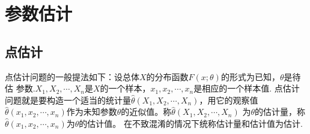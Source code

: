 \section{参数估计}
\subsection{点估计}

\begin{definition}
    点估计问题的一般提法如下：设总体$X$的分布函数$F(x;\theta)$的形式为已知，$\theta$是待估
    参数.$X_1,X_2,\cdots,X_n$是$X$的一个样本，$x_1,x_2,\cdots,x_n$是相应的一个样本值.
    点估计问题就是要构造一个适当的统计量$\hat{\theta}(X_1,X_2,\cdots,X_n)$，用它的观察值
    $\hat{\theta}(x_1,x_2,\cdots,x_n)$作为未知参数$\theta$的近似值。称$\hat{\theta}(X_1,X_2,\cdots,X_n)$
    为$\theta$的{\heiti 估计量}，称$\hat{\theta}(x_1,x_2,\cdots,x_n)$为$\theta$的{\heiti 估计值}。
    在不致混淆的情况下统称估计量和估计值为{\heiti 估计}.
\end{definition}

